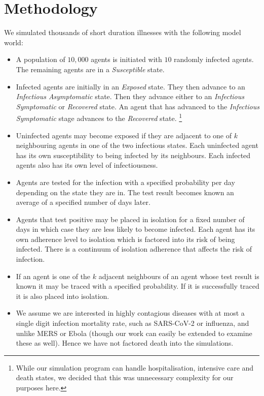 \documentclass{article}
\begin{document}
\section{Methodology}

We simulated thousands of short duration illnesses with the following
model world:

\begin{itemize}

\item A population of $10,000$ agents is initiated with $10$ randomly infected
  agents. The remaining agents are in a \emph{Susceptible} state.

\item Infected agents are initially in an \emph{Exposed} state. They then
  advance to an \emph{Infectious Asymptomatic} state. Then they advance either
  to an \emph{Infectious Symptomatic} or \emph{Recovered} state. An agent that
  has advanced to the \emph{Infectious Symptomatic} stage advances to the
  \emph{Recovered} state. \footnote{While our simulation program can handle
  hospitalisation, intensive care and death states, we decided that this was
  unnecessary complexity for our purposes here.}

\item Uninfected agents may become exposed if they are adjacent to one of $k$
  neighbouring agents in one of the two infectious states. Each uninfected agent
  has its own susceptibility to being infected by its neighbours. Each infected
  agents also has its own level of infectiousness.

\item Agents are tested for the infection with a specified probability per day
depending on the state they are in. The test result becomes known an average
of a specified number of days later.


\item Agents that test positive may be placed in isolation for a fixed
number of days in which case they are less likely to become infected. Each agent
has its own adherence level to isolation which is factored into its risk of
being infected. There is a continuum of isolation adherence that affects the
risk of infection.

\item If an agent is one of the $k$ adjacent neighbours of an agent whose test
result is known it may be traced with a specified probability. If it is
successfully traced it is also placed into isolation.

\item We assume we are interested in highly contagious diseases with at most a
  single digit infection mortality rate, such as SARS-CoV-2 or influenza, and
  unlike MERS or Ebola (though our work can easily be extended to examine these
  as well). Hence we have not factored death into the simulations.

\end{itemize}
\end{document}

